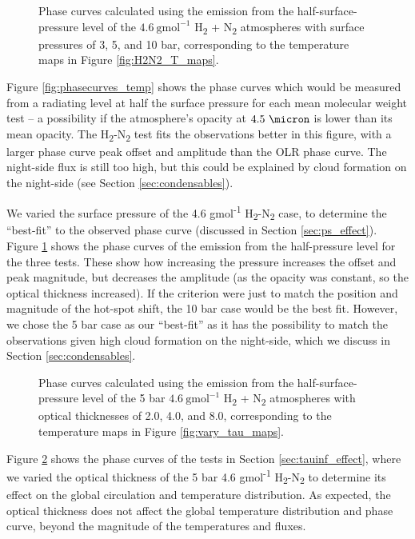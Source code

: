 \begin{figure}
\caption{Phase curves calculated using the emission from the half-surface-pressure level of the $4.6\ \mathrm{gmol}^{-1}$ H\textsubscript{2} + N\textsubscript{2} atmospheres with surface pressures of 3, 5, and 10 bar, corresponding to the temperature maps in Figure \ref{fig:H2N2_T_maps}.\label{fig:phasecurves_H2N2}}
\end{figure}

Figure \ref{fig:phasecurves_temp} shows the phase curves which would be measured from a radiating level at half the surface pressure for each mean molecular weight test -- a possibility if the atmosphere's opacity at $4.5\ \micron$ is lower than its mean opacity. The H\textsubscript{2}-N\textsubscript{2} test fits the observations better in this figure, with a larger phase curve peak offset and amplitude than the OLR phase curve. The night-side flux is still too high, but this could be explained by cloud formation on the night-side (see Section \ref{sec:condensables}).

We varied the surface pressure of the 4.6 gmol\textsuperscript{-1} H\textsubscript{2}-N\textsubscript{2} case, to determine the ``best-fit'' to the observed phase curve (discussed in Section \ref{sec:ps_effect}). Figure \ref{fig:phasecurves_H2N2} shows the phase curves of the emission from the half-pressure level for the three tests. These show how increasing the pressure increases the offset and peak magnitude, but decreases the amplitude (as the opacity was constant, so the optical thickness increased). If the criterion were just to match the position and magnitude of the hot-spot shift, the 10 bar case would be the best fit. However, we chose the 5 bar case as our ``best-fit'' as it has the possibility to match the observations given high cloud formation on the night-side, which we discuss in Section \ref{sec:condensables}.

\begin{figure}
\caption{Phase curves calculated using the emission from the half-surface-pressure level of the 5 bar $4.6\ \mathrm{gmol}^{-1}$ H\textsubscript{2} + N\textsubscript{2} atmospheres with optical thicknesses of 2.0, 4.0, and 8.0, corresponding to the temperature maps in Figure \ref{fig:vary_tau_maps}.\label{fig:phasecurves_tauinf}}
\end{figure}

Figure \ref{fig:phasecurves_tauinf} shows the phase curves of the tests in Section \ref{sec:tauinf_effect}, where we varied the optical thickness of the 5 bar 4.6 gmol\textsuperscript{-1} H\textsubscript{2}-N\textsubscript{2} to determine its effect on the global circulation and temperature distribution. As expected, the optical thickness does not affect the global temperature distribution and phase curve, beyond the magnitude of the temperatures and fluxes.


